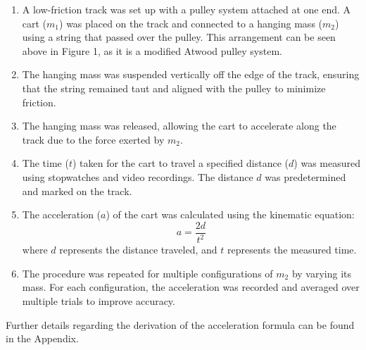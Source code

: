 \begin{enumerate}
    \item A low-friction track was set up with a pulley system attached at one end. A cart (\(m_1\)) was placed on the track and connected to a hanging mass (\(m_2\)) using a string that passed over the pulley. This arrangement can be seen above in Figure 1, as it is a modified Atwood pulley system.
    \item The hanging mass was suspended vertically off the edge of the track, ensuring that the string remained taut and aligned with the pulley to minimize friction.
    \item The hanging mass was released, allowing the cart to accelerate along the track due to the force exerted by \(m_2\).
    \item The time (\(t\)) taken for the cart to travel a specified distance (\(d\)) was measured using stopwatches and video recordings. The distance \(d\) was predetermined and marked on the track.
    \item The acceleration (\(a\)) of the cart was calculated using the kinematic equation:
    \[
    a = \frac{2d}{t^2}
    \]
    where \(d\) represents the distance traveled, and \(t\) represents the measured time.
    \item The procedure was repeated for multiple configurations of \(m_2\) by varying its mass. For each configuration, the acceleration was recorded and averaged over multiple trials to improve accuracy.
\end{enumerate}

Further details regarding the derivation of the acceleration formula can be found in the Appendix.

